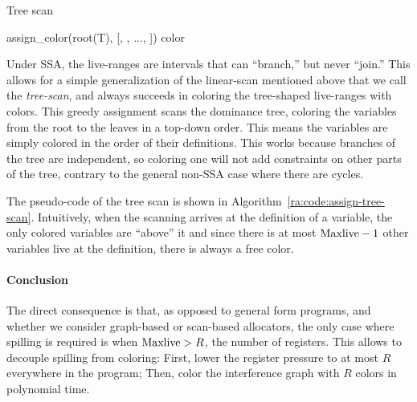 {\begin{algorithm}
  \caption{Tree scan}
  \label{ra:code:assign-tree-scan}



  assign\_color(root(T), [\KwTrue, \KwTrue, ..., \KwTrue])\;
  \Return color
\end{algorithm}



Under SSA, the live-ranges are intervals that can ``branch,'' but never ``join.''
This allows for a simple generalization of the linear-scan mentioned above that we call the \emph{tree-scan},
and always succeeds in coloring the tree-shaped live-ranges with \maxlive colors.
This greedy assignment scans the dominance tree, coloring the variables from the root to the leaves in a top-down order. 
This means the variables are simply colored in the order of their definitions.
This works because branches of the tree are independent, so coloring one will not add constraints on other parts of the tree, contrary to the general non-SSA case where there are cycles.

The pseudo-code of the tree scan is shown in Algorithm~\ref{ra:code:assign-tree-scan}.
Intuitively, when the scanning arrives at the definition of a variable, the only colored variables are ``above'' it and since there is at most $\mathrm{Maxlive}-1$ other variables live at the definition, there is always a free color. 

\paragraph{Conclusion}

The direct consequence is that, as opposed to general form programs, and whether we consider graph-based or scan-based allocators, the only case where spilling is required is when $\mathrm{Maxlive} > R$, the number of registers.
This allows to decouple spilling from coloring: 
First, lower the register pressure to at most $R$ everywhere in the program; 
Then, color the interference graph with $R$ colors in polynomial time.



}

